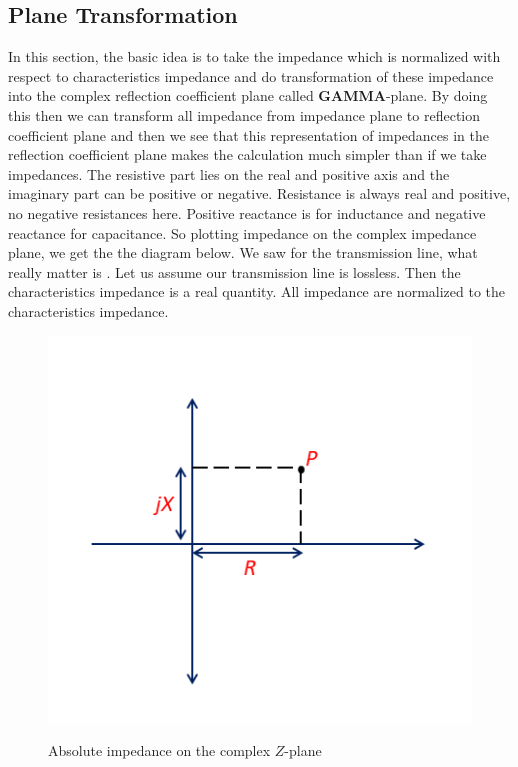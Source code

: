 \subsection{Plane Transformation}
In this section, the basic idea is to take the impedance which is normalized with respect to characteristics impedance and do transformation of these impedance into the complex reflection coefficient plane called \textbf{GAMMA}-plane. By doing this then we can transform all impedance from impedance plane to reflection coefficient plane and then we see that this representation of impedances in the reflection coefficient plane makes the calculation much simpler than if we take impedances. The resistive part lies on the real and positive axis and the imaginary part can be positive or negative. Resistance is always real and positive, no negative resistances here. Positive reactance is for inductance and negative reactance for capacitance. So plotting impedance on the complex impedance plane, we get the the diagram below. We saw for the transmission line, what really matter is . Let us assume our transmission line is lossless. Then the characteristics impedance is a real quantity. All impedance are normalized to the characteristics impedance.
\begin{figure}[h]
\centering
{\includegraphics[width=0.8\linewidth]{graphics/Z_plane1}}
\caption{Absolute impedance on the complex $Z$-plane}
\label{fig:mjhdj}
\end{figure}

